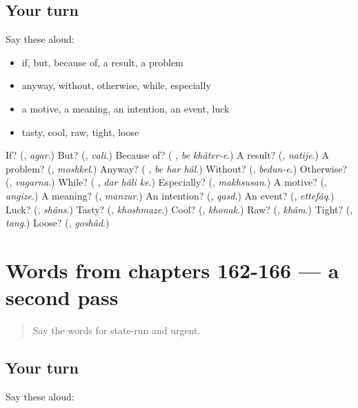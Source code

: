 \subsection*{Your turn}
Say these aloud:

\begin{itemize}
\raggedright
  \item if, but, because of, a result, a problem
  \item anyway, without, otherwise, while, especially
  \item a motive, a meaning, an intention, an event, luck
  \item tasty, cool, raw, tight, loose
\end{itemize}

\begin{tcolorbox}[breakable,colback=teal!4,colframe=teal!35!black,title={Before you move on}]
If? (\textbf{}, \emph{agar}.) But? (\textbf{}, \emph{vali}.) Because of? (\textbf{ }, \emph{be khâter-e}.) A result? (\textbf{}, \emph{natije}.) A problem? (\textbf{}, \emph{moshkel}.) Anyway? (\textbf{  }, \emph{be har hâl}.) Without? (\textbf{}, \emph{bedun-e}.) Otherwise? (\textbf{}, \emph{vagarna}.) While? (\textbf{  }, \emph{dar hâli ke}.) Especially? (\textbf{}, \emph{makhsusan}.) A motive? (\textbf{}, \emph{angize}.) A meaning? (\textbf{}, \emph{manzur}.) An intention? (\textbf{}, \emph{qasd}.) An event? (\textbf{}, \emph{ettefâq}.) Luck? (\textbf{}, \emph{shâns}.) Tasty? (\textbf{}, \emph{khoshmaze}.) Cool? (\textbf{}, \emph{khonak}.) Raw? (\textbf{}, \emph{khâm}.) Tight? (\textbf{}, \emph{tang}.) Loose? (\textbf{}, \emph{goshâd}.)
\end{tcolorbox}
\section[(dialogue)]{Words from chapters 162-166 — a second pass}

\label{lesson:FA-R166-second-pass-words-from-chapters-162-166}



\begin{quote}
Say the words for state-run and urgent.
\end{quote}

\subsection*{Your turn}
Say these aloud:


